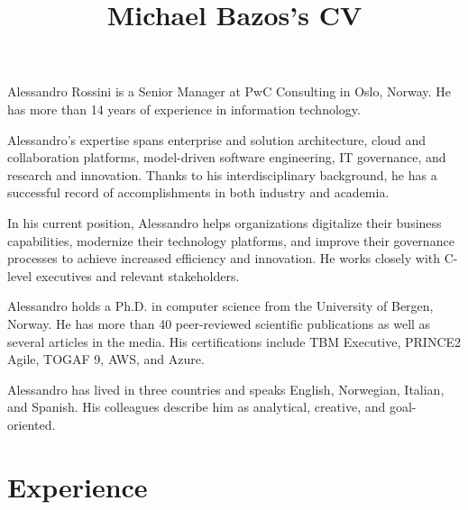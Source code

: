\documentclass[a4paper,online]{adcv}
\title{Michael Bazos’s CV}
\begin{document}
Alessandro Rossini is a Senior Manager at PwC Consulting in Oslo, Norway. He has more than 14 years of experience in information technology.

Alessandro’s expertise spans enterprise and solution architecture, cloud and collaboration platforms, model-driven software engineering, IT governance, and research and innovation. Thanks to his interdisciplinary background, he has a successful record of accomplishments in both industry and academia.

In his current position, Alessandro helps organizations digitalize their business capabilities, modernize their technology platforms, and improve their governance processes to achieve increased efficiency and innovation. He works closely with C-level executives and relevant stakeholders.

Alessandro holds a Ph.D. in computer science from the University of Bergen, Norway. He has more than 40 peer-reviewed scientific publications as well as several articles in the media. His certifications include TBM Executive, PRINCE2 Agile, TOGAF 9, AWS, and Azure.

Alessandro has lived in three countries and speaks English, Norwegian, Italian, and Spanish. His colleagues describe him as analytical, creative, and goal-oriented.

\section{Experience}
\end{document}
